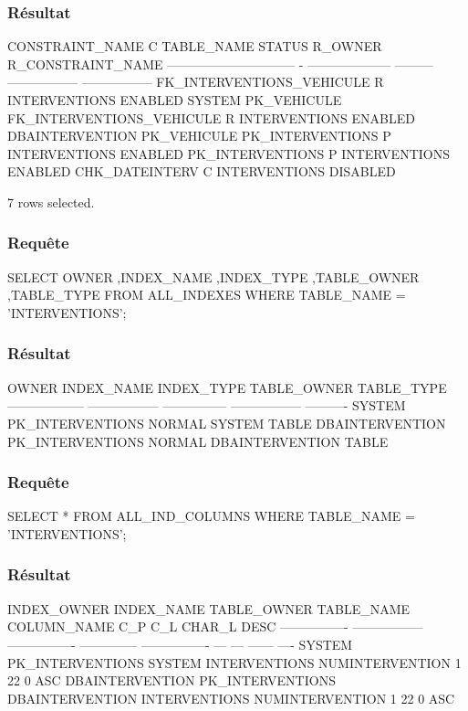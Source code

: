 \documentclass[•]{article}
\begin{document}
\subsubsection{Résultat}
\begin{sql}
CONSTRAINT_NAME                C TABLE_NAME           STATUS	R_OWNER  		  R_CONSTRAINT_NAME
------------------------------ - -------------------- --------- ----------------- -----------------
FK_INTERVENTIONS_VEHICULE      R INTERVENTIONS        ENABLED   SYSTEM            PK_VEHICULE
FK_INTERVENTIONS_VEHICULE      R INTERVENTIONS        ENABLED   DBAINTERVENTION   PK_VEHICULE
PK_INTERVENTIONS               P INTERVENTIONS        ENABLED
PK_INTERVENTIONS               P INTERVENTIONS        ENABLED
CHK_DATEINTERV                 C INTERVENTIONS        DISABLED

7 rows selected.
\end{sql}
 
\subsubsection{Requête}
\begin{sql}
 SELECT  OWNER ,INDEX_NAME ,INDEX_TYPE ,TABLE_OWNER ,TABLE_TYPE  
 FROM ALL_INDEXES 
 WHERE TABLE_NAME = 'INTERVENTIONS';
\end{sql}

\subsubsection{Résultat}
\begin{sql}
OWNER              INDEX_NAME	  	 INDEX_TYPE      TABLE_OWNER       TABLE_TYPE
------------------ ----------------- --------------- ----------------- ----------
SYSTEM             PK_INTERVENTIONS  NORMAL          SYSTEM            TABLE
DBAINTERVENTION    PK_INTERVENTIONS  NORMAL          DBAINTERVENTION   TABLE
\end{sql}
  
  
\subsubsection{Requête}
\begin{sql}
 SELECT * 
 FROM ALL_IND_COLUMNS 
 WHERE TABLE_NAME = 'INTERVENTIONS';
\end{sql}

\subsubsection{Résultat}
\begin{sql}
 INDEX_OWNER     INDEX_NAME	       TABLE_OWNER      TABLE_NAME     COLUMN_NAME      C_P C_L CHAR_L DESC
---------------- ----------------- ---------------- -------------- ---------------- --- --- ------ ----
SYSTEM           PK_INTERVENTIONS  SYSTEM           INTERVENTIONS  NUMINTERVENTION  1   22  0      ASC
DBAINTERVENTION  PK_INTERVENTIONS  DBAINTERVENTION  INTERVENTIONS  NUMINTERVENTION  1   22  0      ASC
\end{sql}
\end{document}
